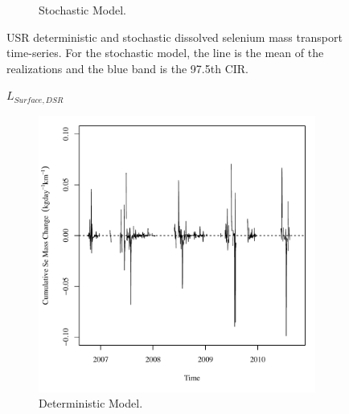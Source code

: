 \begin{landscape}
\begin{figure}
\begin{subfigure}{0.7\textwidth}
			\caption{Stochastic Model.}
		\end{subfigure}
		\caption[USR deterministic and stochastic dissolved selenium mass transport time-series.]{USR deterministic and stochastic dissolved selenium mass transport time-series.  For the stochastic model, the line is the mean of the realizations and the blue band is the 97.5th CIR.}
		\label{fig:massReachTrans_USR}
	\end{figure}
\end{landscape}
\subfiguretop
\begin{landscape}
	\begin{figure}
		$ \displaystyle L_{Surface,DSR} $
		\begin{subfigure}{0.7\textwidth}
			\centering
			\includegraphics[width=\tableCustomSize]{"Figures/Results_DSR/Deterministic/Balance Mass - Storage"}
			\caption{Deterministic Model.}
		\end{subfigure}%
		\begin{subfigure}{0.7\textwidth}
			\centering

\end{subfigure}
\end{figure}
\end{landscape}
